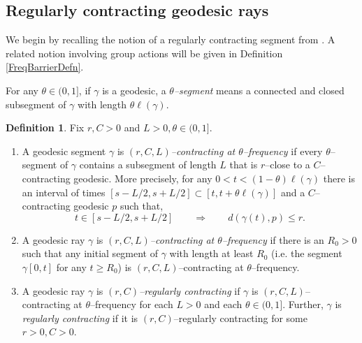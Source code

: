 \documentclass{amsart}
\theoremstyle{definition}
\newtheorem{defn}[thm]{Definition}
\theoremstyle{remark}
\begin{document}
\subsection{Regularly  contracting geodesic rays}
 



We begin by recalling the notion of a regularly contracting segment from \cite{GQR22}. A related  notion involving group actions will be given in Definition \ref{FreqBarrierDefn}. 

For any $\theta\in (0,1]$, if $\gamma$ is a geodesic, a \textit{$\theta$--segment} means   a connected and closed subsegment of $\gamma$ with length $\theta \ell(\gamma)$.
 
\begin{defn}\label{FreqContrDefn}
Fix $r,C>0$ and $L>0, \theta\in (0,1]$.
\begin{enumerate}

\item A geodesic segment $\gamma$  is \textit{$(r, C, L)$--contracting at $\theta$–frequency}     if  every $\theta$--segment of $\gamma$ contains a subsegment of length $L$ that is $r$--close to a  $C$–contracting geodesic. More precisely,
for any $0 < t < (1-\theta)\ell(\gamma)$ there is an interval 
of times $[s-L/2, s+L/2] \subset [t, t+ \theta \ell(\gamma)]$ and a $C$--contracting geodesic $p$ such that, 
\begin{equation}\label{rclosetopEQ}
t \in [s-L/2 , s+L/2]
\qquad\Longrightarrow \qquad
d(\gamma(t), p) \leq r.    
\end{equation}

\item A geodesic ray $\gamma$  is \textit{$(r, C, L)$--contracting at $\theta$–frequency} if there is an $R_0>0$ such that any initial segment of $\gamma$ with length at least $R_0$ (i.e. the segment $\gamma[0,t]$ for any $t\ge R_0$) is $(r, C, L)$--contracting at $\theta$–frequency.  

\item A geodesic ray $\gamma$ is \emph{$(r,C)$--regularly contracting} 
if $\gamma$ is $(r, C, L)$--contracting at $\theta$–frequency  for each $L>0$ and each $\theta\in (0,1]$.   Further, $\gamma$ is \textit{regularly contracting} if it is {$(r,C)$--regularly contracting} for some $r>0,C>0$.  
    
\end{enumerate}
\end{defn}
\end{document}
